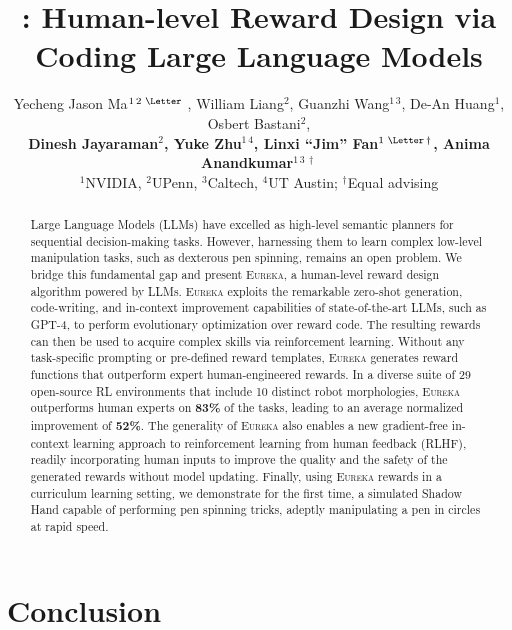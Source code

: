 \documentclass{article} %
\title{\ourmethod: Human-level Reward Design via \\ Coding Large Language Models}
\author{%
    Yecheng Jason Ma$^{1\,2 \text{ \Letter}}$ , William Liang$^2$, Guanzhi Wang$^{1\,3}$, De-An Huang$^{1}$, Osbert Bastani$^{2}$,\\
    \textbf{Dinesh Jayaraman$^{2}$, Yuke Zhu$^{1\,4}$, Linxi ``Jim'' Fan$^{1\text{ \Letter}\,\dag}$, Anima Anandkumar$^{1\,3\,\dag }$}\\
    \hspace{2.3cm} $^1$NVIDIA, $^2$UPenn, $^3$Caltech, $^4$UT Austin; $^\dag$Equal advising\\
    \hspace{3cm} \weburl
}
\theoremstyle{definition}
\newcommand{\ourmethod}{\mbox{\textsc{Eureka}}\xspace}
\begin{document}
\doparttoc %
\faketableofcontents %

\maketitle

\begin{abstract}

Large Language Models (LLMs) have excelled as high-level semantic planners for sequential decision-making tasks. However, harnessing them to learn complex low-level manipulation tasks, such as dexterous pen spinning, remains an open problem. We bridge this fundamental gap and present \ourmethod, a human-level reward design algorithm powered by LLMs. \ourmethod exploits the remarkable zero-shot generation, code-writing, and in-context improvement capabilities of state-of-the-art LLMs, such as GPT-4, to perform evolutionary optimization over reward code. The resulting rewards can then be used to acquire complex skills via reinforcement learning. Without any task-specific prompting or pre-defined reward templates, \ourmethod generates reward functions that outperform expert human-engineered rewards. In a diverse suite of 29 open-source RL environments that include 10 distinct robot morphologies, \ourmethod outperforms human experts on \textbf{83\%} of the tasks, leading to an average normalized improvement of \textbf{52\%}. The generality of \ourmethod also enables a new gradient-free in-context learning approach to reinforcement learning from human feedback (RLHF), readily incorporating human inputs to improve the quality and the safety of the generated rewards without model updating. Finally, using \ourmethod rewards in a curriculum learning setting, we demonstrate for the first time, a simulated Shadow Hand capable of performing pen spinning tricks, adeptly manipulating a pen in circles at rapid speed. 





\end{abstract}

















\vspace{-0.3cm}
\section{Conclusion}
\vspace{-0.3cm}
\end{document}
